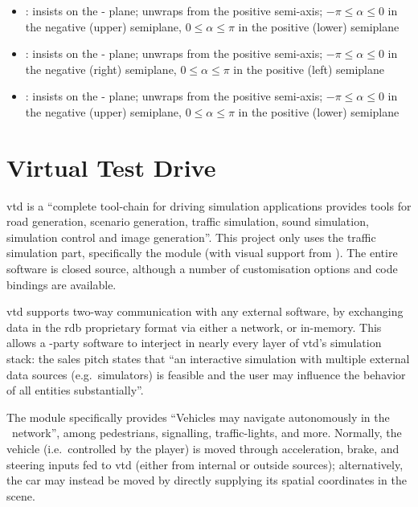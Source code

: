 \begin{itemize}
	\item {}: insists on the - plane; unwraps from the positive  semi-axis; $-\pi \leqslant \alpha \leqslant 0$ in the negative (upper) semiplane, $0 \leqslant \alpha \leqslant \pi$ in the positive (lower) semiplane
	\item {}: insists on the - plane; unwraps from the positive  semi-axis; $-\pi \leqslant \alpha \leqslant 0$ in the negative (right) semiplane, $0 \leqslant \alpha \leqslant \pi$ in the positive (left) semiplane
	\item {}: insists on the - plane; unwraps from the positive  semi-axis; $-\pi \leqslant \alpha \leqslant 0$ in the negative (upper) semiplane, $0 \leqslant \alpha \leqslant \pi$ in the positive (lower) semiplane
\end{itemize}

\section{Virtual Test Drive}\label{sc:software:vtd}

\acrfull{vtd} is a \enquote{complete tool-chain for driving simulation applications \FONTnormal{[that]} provides tools for road generation, scenario generation, traffic simulation, sound simulation, simulation control and image generation}{\cite{software:vtd}}. This project only uses the traffic simulation part, specifically the  module (with visual support from ). The entire software is closed source, although a number of customisation options and code bindings are available.

\gls{vtd} supports two-way communication with any external software, by exchanging data in the \gls{rdb} proprietary format via either a network, or in-memory. This allows a -party software to interject in nearly every layer of \gls{vtd}'s simulation stack: the sales pitch states that \enquote{an interactive simulation with multiple external data sources (e.g.\ simulators) is feasible and the user may influence the behavior of all entities substantially}{\cite{software:vtraffic}}.

The  module specifically provides \enquote{Vehicles \FONTnormal{[that]} may navigate autonomously in the \CHARomissis\ network}{\cite{software:vtraffic}}, among pedestrians, signalling, traffic-lights, and more. Normally, the  vehicle (i.e.\ controlled by the player) is moved through acceleration, brake, and steering inputs fed to \gls{vtd} (either from internal or outside sources); alternatively, the  car may instead be moved by directly supplying its spatial coordinates in the scene.

